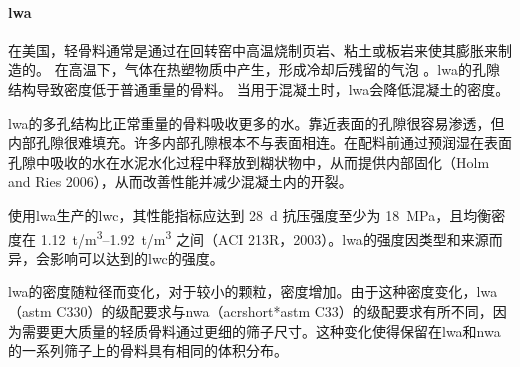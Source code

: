 \paragraph{\acrfull*{lwa}}
在美国，轻骨料通常是通过在回转窑中高温烧制页岩、粘土或板岩来使其膨胀来制造的。 在高温下，气体在热塑物质中产生，形成冷却后残留的气泡 \cite{aci2003g}。\acrlong*{lwa}的孔隙结构导致密度低于普通重量的骨料。 当用于混凝土时，\acrlong*{lwa}会降低混凝土的密度。

\acrlong*{lwa}的多孔结构比正常重量的骨料吸收更多的水。靠近表面的孔隙很容易渗透，但内部孔隙很难填充。许多内部孔隙根本不与表面相连。在配料前通过预润湿在表面孔隙中吸收的水在水泥水化过程中释放到糊状物中，从而提供内部固化（Holm and Ries 2006），从而改善性能并减少混凝土内的开裂。

使用\acrlong{lwa}生产的\acrfull*{lwc}，其性能指标应达到 \qty{28}{d} 抗压强度至少为 \qty{18}{MPa}，且均衡密度在 \qtyrange{1.12}{1.92}{t/m^3} 之间（ACI 213R，2003）。\acrlong*{lwa}的强度因类型和来源而异，会影响可以达到的\acrlong*{lwc}的强度。

\acrlong*{lwa}的密度随粒径而变化，对于较小的颗粒，密度增加。由于这种密度变化，\acrlong*{lwa}（\acrshort*{astm} C330）的级配要求与\acrlong*{nwa}（acrshort*{astm} C33）的级配要求有所不同，因为需要更大质量的轻质骨料通过更细的筛子尺寸。这种变化使得保留在\acrlong*{lwa}和\acrlong*{nwa}的一系列筛子上的骨料具有相同的体积分布。

